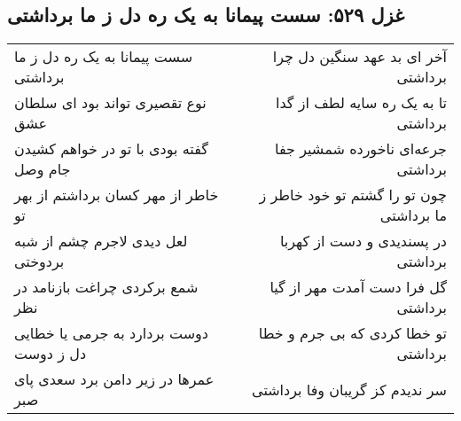 \begin{center}
\section*{غزل ۵۲۹: سست پیمانا به یک ره دل ز ما برداشتی}
\label{sec:529}
\begin{longtable}{l p{0.5cm} r}
سست پیمانا به یک ره دل ز ما برداشتی
&&
آخر ای بد عهد سنگین دل چرا برداشتی
\\
نوع تقصیری تواند بود ای سلطان عشق
&&
تا به یک ره سایه لطف از گدا برداشتی
\\
گفته بودی با تو در خواهم کشیدن جام وصل
&&
جرعه‌ای ناخورده شمشیر جفا برداشتی
\\
خاطر از مهر کسان برداشتم از بهر تو
&&
چون تو را گشتم تو خود خاطر ز ما برداشتی
\\
لعل دیدی لاجرم چشم از شبه بردوختی
&&
در پسندیدی و دست از کهربا برداشتی
\\
شمع برکردی چراغت بازنامد در نظر
&&
گل فرا دست آمدت مهر از گیا برداشتی
\\
دوست بردارد به جرمی یا خطایی دل ز دوست
&&
تو خطا کردی که بی جرم و خطا برداشتی
\\
عمرها در زیر دامن برد سعدی پای صبر
&&
سر ندیدم کز گریبان وفا برداشتی
\\
\end{longtable}
\end{center}
